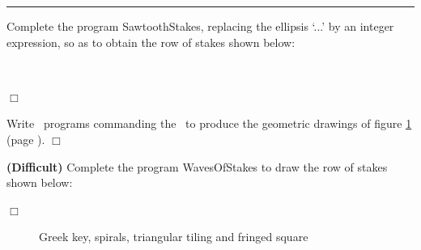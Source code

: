 {}\noindent \rule{137mm}{0.1mm}\par\nopagebreak %
\begin{exercice}{ Complete the program {\idt SawtoothStakes}, replacing the
ellipsis `{\idt ...}' by an integer expression, so as to
ob\-tain the row of stakes shown below:

\raggedright{
\vspace*{20mm}%
\ \\%
}



\noindent $\Box$}\end{exercice}
\begin{exercice}{ Write \python\ programs commanding the \robot\ to produce the
geometric drawings of figure  \ref{fig:spcf} (page  \pageref{fig:spcf}). $\Box$}\end{exercice}
\begin{exercice}{{\bf (Difficult)} Complete the program {\idt WavesOfStakes} to
draw the row of stakes shown below:

\pagebreak[3]
\raggedright{
\vspace{0.5cm}

}


\noindent $\Box$}\end{exercice}
\begin{figure}[hb]%
\caption{Greek key, spirals, triangular tiling and fringed square}
 \label{fig:spcf}
\end{figure}

\clearpage

